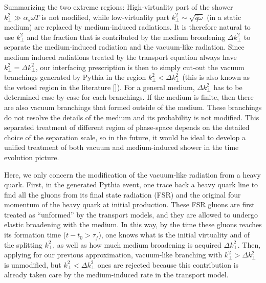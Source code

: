 Summarizing the two extreme regions:
High-virtuality part of the shower $k_\perp^2 \gg \alpha_s \omega T$ is not modified, while low-virtuality part $k_\perp^2 \sim \sqrt{\hat{q}\omega}$ (in a static medium) are replaced by medium-induced radiations.
It is therefore natural to use $k_\perp^2$ and the fraction that is contributed by the medium broadening $\Delta k_\perp^2$ to separate the medium-induced radiation and the vacuum-like radiation.
Since medium induced radiations treated by the transport equation always have $k_\perp^2 = \Delta k_\perp^2$,  our interfacing prescription is then to simply cut-out the vacuum branchings generated by Pythia in the region $k_\perp^2 <  \Delta k_\perp^2$ (this is also known as the vetoed region in the literature []).
For a general medium, $\Delta k_\perp^2$ has to be determined case-by-case for each branchings.
If the medium is finite, then there are also vacuum branchings that formed outside of the medium.
These branchings do not resolve the details of the medium and its probability is not modified.
This separated treatment of different region of phase-space depends on the detailed choice of the separation scale, so in the future, it would be ideal to develop a unified treatment of both vacuum and medium-induced shower in the time evolution picture.

Here, we only concern the modification of the vacuum-like radiation from a heavy quark.
First, in the generated Pythia event, one trace back a heavy quark line to find all the gluons from its final state radiation (FSR) and the original four momentum of the heavy quark at initial production.
These FSR gluons are first treated as ``unformed'' by the transport models, and they are allowed to undergo elastic broadening with the medium.
In this way, by the time these gluons reaches its formation time ($t-t_0>\tau_f$), one knows what is the initial virtuality and of the splitting $k_\perp^2$, as well as how much medium broadening is acquired $\Delta k_\perp^2$.
Then, applying for our previous approximation, vacuum-like branching with 
$k_\perp^2 > \Delta k_\perp^2$ is unmodified, but $k_\perp^2 < \Delta k_\perp^2$ ones are rejected because this contribution is already taken care by the medium-induced rate in the transport model.

